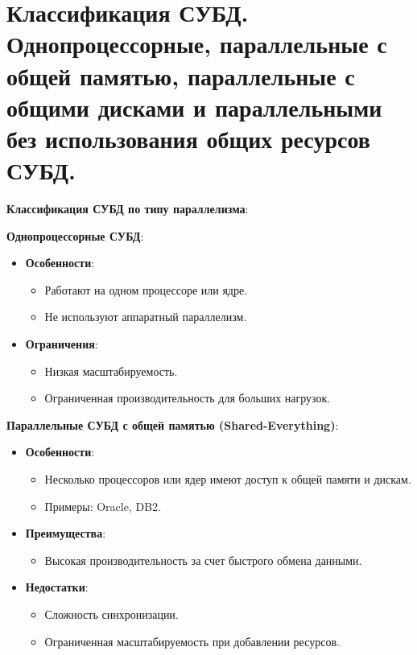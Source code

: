 \documentclass[a4paper,12pt]{article}
\begin{document}
\section{Классификация СУБД. Однопроцессорные, параллельные с общей памятью, параллельные с общими дисками и параллельными без использования общих ресурсов СУБД.}

\textbf{Классификация СУБД по типу параллелизма}:

\textbf{Однопроцессорные СУБД}:

\begin{itemize}
    \item \textbf{Особенности}:
    \begin{itemize}
        \item Работают на одном процессоре или ядре.
        \item Не используют аппаратный параллелизм.
    \end{itemize}
    \item \textbf{Ограничения}:
    \begin{itemize}
        \item Низкая масштабируемость.
        \item Ограниченная производительность для больших нагрузок.
    \end{itemize}
\end{itemize}

\textbf{Параллельные СУБД с общей памятью (Shared-Everything)}:

\begin{itemize}
    \item \textbf{Особенности}:
    \begin{itemize}
        \item Несколько процессоров или ядер имеют доступ к общей памяти и дискам.
        \item Примеры: Oracle, DB2.
    \end{itemize}
    \item \textbf{Преимущества}:
    \begin{itemize}
        \item Высокая производительность за счет быстрого обмена данными.
    \end{itemize}
    \item \textbf{Недостатки}:
    \begin{itemize}
        \item Сложность синхронизации.
        \item Ограниченная масштабируемость при добавлении ресурсов.
    \end{itemize}
\end{itemize}
\end{document}
